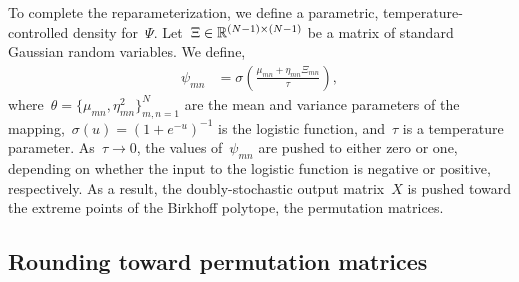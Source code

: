 \documentclass[twoside]{article}
\begin{document}
To complete the reparameterization, we define a parametric,
temperature-controlled density for~$\Psi$.
Let~${\Xi \in \mathbb{R}^{(N-1) \times (N-1)}}$ be a matrix of standard
Gaussian random variables.  We
define,
\begin{align*}
  \psi_{mn} &= \sigma\left( \frac{\mu_{mn} + \eta_{mn} \Xi_{mn}}{\tau} \right),
\end{align*}
where~${\theta = \{\mu_{mn}, \eta^2_{mn}\}_{m,n=1}^N}$ are the mean
and variance parameters of the
mapping,~${\sigma(u) = (1+e^{-u})^{-1}}$ is the logistic function,
and~$\tau$ is a temperature parameter. As~$\tau \to 0$, the values
of~$\psi_{mn}$ are pushed to either zero or one, depending on whether
the input to the logistic function is negative or positive,
respectively.  As a result, the doubly-stochastic output matrix~$X$ is
pushed toward the extreme points of the Birkhoff polytope, the
permutation matrices.

\subsection{Rounding toward permutation matrices}
\label{sub:rounding}
\end{document}
